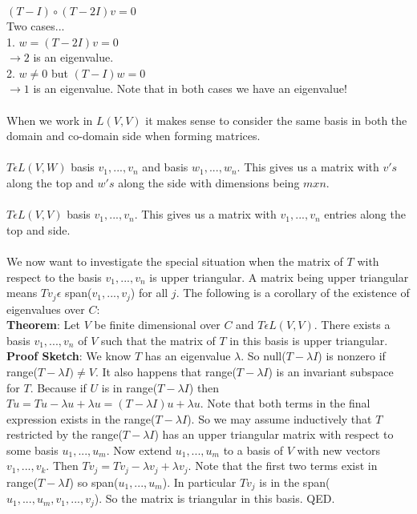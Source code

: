 \documentclass{article}
\begin{document}
$(T-I) \circ (T-2I)v = 0$\\
Two cases...\\
1. $w = (T-2I)v = 0$ \\
$\rightarrow 2$ is an eigenvalue. \\
2. $w \neq 0$ but $(T-I)w = 0$\\
$\rightarrow 1$ is an eigenvalue. Note that in both cases we have an eigenvalue! \\\\
When we work in $L(V,V)$ it makes sense to consider the same basis in both the domain and co-domain side when forming matrices. \\\\
$T\epsilon L(V,W)$ basis $v_1, ..., v_n$ and basis $w_1,...,w_n$. This gives us a matrix with $v's$ along the top and $w's$ along the side with dimensions being $mxn$. \\\\
$T\epsilon L(V,V)$ basis $v_1,...,v_n$. This gives us a matrix with $v_1,...,v_n$ entries along the top and side. \\\\
We now want to investigate the special situation when the matrix of $T$ with respect to the basis $v_1,...,v_n$ is upper triangular. A matrix being upper triangular means $Tv_j \epsilon$ span($v_1,..., v_j$) for all $j$. The following is a corollary of the existence of eigenvalues over $C$: \\
\textbf{Theorem}: Let $V$ be finite dimensional over $C$ and $T\epsilon L(V,V)$. There exists a basis $v_1,...,v_n$ of $V$ such that the matrix of $T$ in this basis is upper triangular. \\
\textbf{Proof Sketch}: We know $T$ has an eigenvalue $\lambda$. So null($T-\lambda I$) is nonzero if range($T-\lambda I) \neq V$. It also happens that range($T- \lambda I$) is an invariant subspace for $T$. Because if $U$ is in range($T- \lambda I$) then $Tu = Tu - \lambda u + \lambda u = (T- \lambda I)u + \lambda u$. Note that both terms in the final expression exists in the range($T- \lambda I$). So we may assume inductively that $T$ restricted by the range($T- \lambda I$) has an upper triangular matrix with respect to some basis $u_1,...,u_m$. Now extend $u_1,...,u_m$ to a basis of $V$ with new vectors $v_1,...,v_k$. Then $Tv_j = Tv_j - \lambda v_j + \lambda v_j$. Note that the first two terms exist in range($T- \lambda I$) so span($u_1,...,u_m$). In particular $Tv_j$ is in the span($u_1,...,u_m,v_1,...,v_j$). So the matrix is triangular in this basis. QED. 
\end{document}
